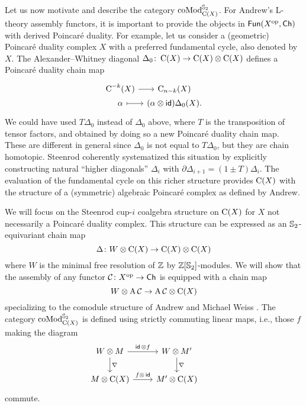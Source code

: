 Let us now motivate and describe the category $\operatorname{coMod}^{\mathbb{S}_2}_{\operatorname{C}(X)}$.
For Andrew's L-theory assembly functors, it is important to provide the objects in $\mathsf{Fun}(X^{\mathrm{op}}, \mathsf{Ch})$ with derived Poincar\'e duality.
For example, let us consider a (geometric) Poincar\'e duality complex $X$ with a preferred fundamental cycle, also denoted by $X$.
The Alexander--Whitney diagonal $\Delta_0 \colon \operatorname{C}(X) \to \operatorname{C}(X) \otimes \operatorname{C}(X)$ defines a Poincar\'e duality chain map
\[
\begin{tikzcd}[column sep=tiny,row sep=0]
	\cochains^{-k}(X) \arrow[r] & \chains_{n-k}(X) \\
	\alpha \arrow[r,mapsto] & (\alpha \ot \id)\Delta_0(X).
\end{tikzcd}
\]
We could have used $T\Delta_0$ instead of $\Delta_0$ above, where $T$ is the transposition of tensor factors, and obtained by doing so a new Poincar\'e duality chain map.
These are different in general since $\Delta_0$ is not equal to $T \Delta_0$, but they are chain homotopic.
Steenrod \cite{steenrod1947products} coherently systematized this situation by explicitly constructing natural ``higher diagonals'' $\Delta_i$ with $\partial \Delta_{i+1} = (1 \pm T) \Delta_i$.
The evaluation of the fundamental cycle on this richer structure provides $\operatorname{C}(X)$ with the structure of a (symmetric) algebraic Poincar\'e complex as defined by Andrew.

We will focus on the Steenrod cup-$i$ coalgebra structure on $\operatorname{C}(X)$ for $X$ not necessarily a Poincar\'e duality complex.
This structure can be expressed as an $\mathbb{S}_2$-equivariant chain map
\[
\Delta \colon W \otimes \operatorname{C}(X) \to \operatorname{C}(X) \otimes \operatorname{C}(X)
\]
where $W$ is the minimal free resolution of $\mathbb{Z}$ by $\mathbb{Z}[\mathbb{S}_2]$-modules.
We will show that the assembly of any functor $\mathcal{C} \colon X^{\mathrm{op}} \to \mathsf{Ch}$ is equipped with a chain map
\[
W \otimes \operatorname{A} \mathcal{C} \to \operatorname{A} \mathcal{C} \otimes \operatorname{C}(X)
\]
specializing to the comodule structure of Andrew and Michael Weiss \cite[Proposition 5.3]{ranicki1990assembly}.
The category $\operatorname{coMod}^{\mathbb{S}_2}_{\operatorname{C}(X)}$ is defined using strictly commuting linear maps, i.e., those $f$ making the diagram
\[
\begin{tikzcd}
	W \ot M \arrow[d, "\nabla"] \arrow[r, "\id\, \ot f"] &
	W \ot M' \arrow[d, "\nabla"] & \\
	M \ot \chains(X) \arrow[r, "f \ot\, \id"] &
	M' \ot \chains(X)
\end{tikzcd}
\]
commute.
